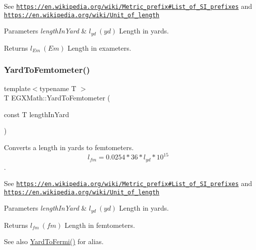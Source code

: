 See \href{https://en.wikipedia.org/wiki/Metric_prefix#List_of_SI_prefixes}{\tt https\+://en.\+wikipedia.\+org/wiki/\+Metric\+\_\+prefix\#\+List\+\_\+of\+\_\+\+S\+I\+\_\+prefixes} and \href{https://en.wikipedia.org/wiki/Unit_of_length}{\tt https\+://en.\+wikipedia.\+org/wiki/\+Unit\+\_\+of\+\_\+length} 
\begin{DoxyParams}{Parameters}
{\em length\+In\+Yard} & $ l_{yd}\ (yd)$ Length in yards. \\
\hline
\end{DoxyParams}
\begin{DoxyReturn}{Returns}
$ l_{Em}\ (Em)$ Length in exameters. 
\end{DoxyReturn}
\mbox{\label{group___e_g_x_math-_conversions-_length_conversions-_imperial-_yard-_s_i_ga682215c180b4fc28ca37e6785b59788d}} 
\subsubsection{\texorpdfstring{Yard\+To\+Femtometer()}{YardToFemtometer()}}
{\footnotesize\ttfamily template$<$typename T $>$ \\
T E\+G\+X\+Math\+::\+Yard\+To\+Femtometer (\begin{DoxyParamCaption}\item[{const T}]{length\+In\+Yard }\end{DoxyParamCaption})}



Converts a length in yards to femtometers. \[ l_{fm}=0.0254 * 36 * l_{yd} * 10^{15} \]. 

See \href{https://en.wikipedia.org/wiki/Metric_prefix#List_of_SI_prefixes}{\tt https\+://en.\+wikipedia.\+org/wiki/\+Metric\+\_\+prefix\#\+List\+\_\+of\+\_\+\+S\+I\+\_\+prefixes} and \href{https://en.wikipedia.org/wiki/Unit_of_length}{\tt https\+://en.\+wikipedia.\+org/wiki/\+Unit\+\_\+of\+\_\+length} 
\begin{DoxyParams}{Parameters}
{\em length\+In\+Yard} & $ l_{yd}\ (yd)$ Length in yards. \\
\hline
\end{DoxyParams}
\begin{DoxyReturn}{Returns}
$ l_{fm}\ (fm)$ Length in femtometers. 
\end{DoxyReturn}
\begin{DoxySeeAlso}{See also}
\mbox{\hyperlink{group___e_g_x_math-_conversions-_length_conversions-_imperial-_yard-_non-_s_i_ga796a8607338fefb728574de07375543f}{Yard\+To\+Fermi()}} for alias. 
\end{DoxySeeAlso}
\mbox{\label{group___e_g_x_math-_conversions-_length_conversions-_imperial-_yard-_s_i_gad6931b2e09213f4f3ceee9c5cc6a4b44}} 
